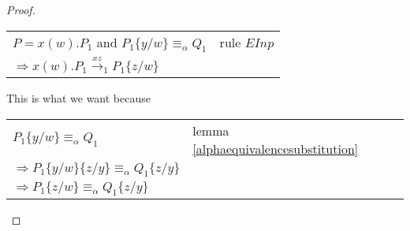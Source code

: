 \begin{theorem}
\begin{proof}
\begin{description}
		\begin{center}
		  \begin{tabular}{ll}
		    $P=x(w).P_{1}$ and $P_{1}\{y/w\}\equiv_{\alpha}Q_{1}$& rule $EInp$\\
		    $\Rightarrow x(w).P_{1}\xrightarrow{x z}_{1}P_{1}\{z/w\}$& \\
		  \end{tabular}
		\end{center}
		This is what we want because 
		\begin{center}
		  \begin{tabular}{ll}
		      $P_{1}\{y/w\}\equiv_{\alpha}Q_{1}$
		    &
		      lemma \ref{alphaequivalencesubstitution}
		  \\
		      $\Rightarrow P_{1}\{y/w\}\{z/y\}\equiv_{\alpha}Q_{1}\{z/y\}$
		    &
		      
		  \\
		      $\Rightarrow P_{1}\{z/w\}\equiv_{\alpha}Q_{1}\{z/y\}$
		    &
		      

\end{tabular}
\end{center}
\end{description}
\end{proof}
\end{theorem}
